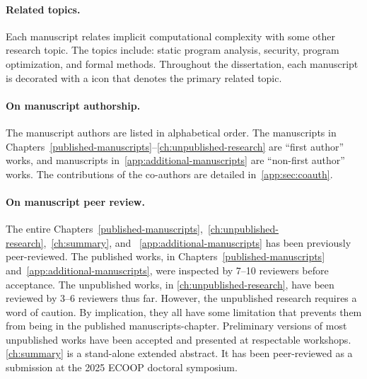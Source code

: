 \begin{description}
      
\end{description}

\paragraph*{Related topics.}
Each manuscript relates implicit computational complexity with some other research topic.
The topics include: static program analysis, security, program optimization, and formal methods.
Throughout the dissertation, each manuscript is decorated with a icon that denotes the primary related topic.

\paragraph*{On manuscript authorship.}
The manuscript authors are listed in alphabetical order.
The manuscripts in Chapters~\ref{published-manuscripts}--\ref{ch:unpublished-research} are \enquote{first author} works,
and manuscripts in~\autoref{app:additional-manuscripts} are \enquote{non-first author} works.
The contributions of the co-authors are detailed in~\autoref{app:sec:coauth}.

\paragraph*{On manuscript peer review.}
The entire Chapters~\ref{published-manuscripts},~\ref{ch:unpublished-research},~\ref{ch:summary}, and ~\ref{app:additional-manuscripts}
has been previously peer-reviewed.
The published works, in Chapters~\ref{published-manuscripts} and~\ref{app:additional-manuscripts}, were inspected by 7--10 reviewers before acceptance.
The unpublished works, in \autoref{ch:unpublished-research}, have been reviewed by 3--6 reviewers thus far.
However, the unpublished research requires a word of caution.
By implication, they all have some limitation that prevents them from being in the {published} manuscripts-chapter.
Preliminary versions of most unpublished works have been accepted and presented at respectable workshops.
\autoref{ch:summary} is a stand-alone extended abstract.
It has been peer-reviewed as a submission at the 2025 ECOOP doctoral symposium.

